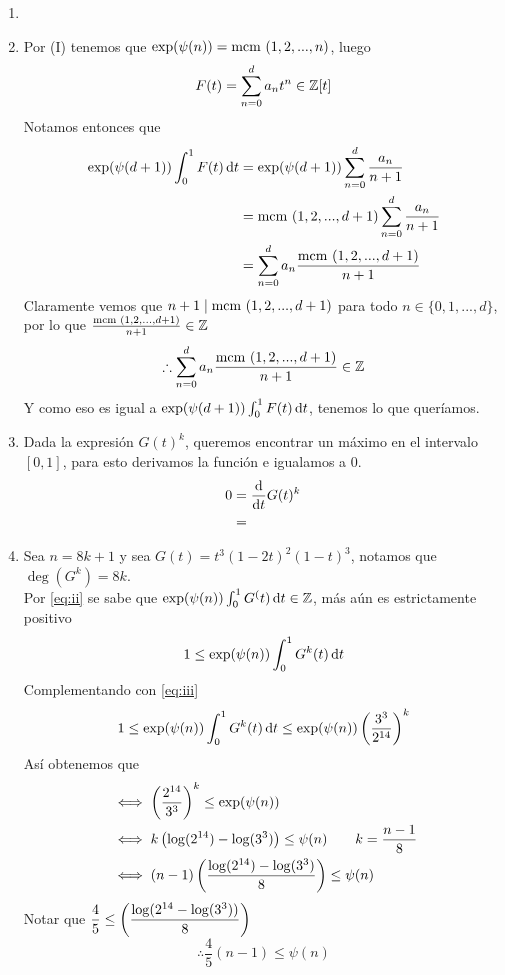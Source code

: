 \begin{sol}
	\begin{enumerate}[label = \roman*]
		\item

		\item Por (I) tenemos que $\exp(\psi(n))=\text{mcm }(1,2,...,n)$, luego
		      \[F(t)=\sum_{n=0}^da_nt^n\in\mathbb{Z}[t]\]
		      Notamos entonces que
		      \begin{align*}
			      \exp(\psi(d+1))\int_0^1 F(t)\operatorname{d}\!{t} & =\exp(\psi(d+1))\sum_{n=0}^d\frac{a_n}{n+1}   \\
			                                        & =\text{mcm }(1,2,...,d+1)\sum_{n=0}^d\frac{a_n}{n+1} \\
			                                        & =\sum_{n=0}^da_n\frac{\text{mcm }(1,2,...,d+1)}{n+1}
		      \end{align*}
		      Claramente vemos que $n+1\mid\text{mcm }(1,2,...,d+1)$ para todo $n\in\{0,1,...,d\}$, por lo que $\frac{\text{mcm }(1,2,...,d+1)}{n+1}\in\mathbb{Z}$
			  \begin{equation*}
				\therefore \sum_{n=0}^da_n\frac{\text{mcm }(1,2,...,d+1)}{n+1}\in\mathbb{Z}\label{eq:ii}
			  \end{equation*}
		      Y como eso es igual a $\exp(\psi(d+1))\int_0^1F(t)\operatorname{d}\!{t}$, tenemos lo que queríamos.

		\item Dada la expresión $G(t)^k$, queremos encontrar un máximo en el intervalo $[0,1]$, para esto derivamos la función e igualamos a 0.
		      \begin{align*}
			      0 & =\frac{\operatorname{d}\!{}}{\operatorname{d}\!{t}}G(t)^k \\
			        & =
		      \end{align*}
			  \label{eq:iii}
		\item Sea $n=8k+1$ y sea $G(t)=t^3(1-2t)^2(1-t)^3$, notamos que $\deg(G^k)=8k$.\\
		Por \eqref{eq:ii} se sabe que $\exp(\psi(n))\int_0^1G^(t)\operatorname{d}\!{t}\in\mathbb{Z}$, más aún es estrictamente positivo
		\begin{equation*}
			1\leq\exp(\psi(n))\int_0^1G^k(t)\operatorname{d}\!{t}
		\end{equation*}
		Complementando con \eqref{eq:iii}
		\begin{equation*}
			1\leq\exp(\psi(n))\int_0^1G^k(t)\operatorname{d}\!{t}\leq\exp(\psi(n))\left(\frac{3^3}{2^{14}}\right)^k
		\end{equation*}
		Así obtenemos que
		\begin{align*}
			&\iff\left(\dfrac{2^{14}}{3^3}\right)^k\leq\exp(\psi(n))\\
			&\iff k\left(\log(2^{14})-\log(3^3)\right)\leq\psi(n)\qquad k=\frac{n-1}{8}\\
			&\iff (n-1)\left(\frac{\log(2^{14})-\log(3^3)}8\right)\leq\psi(n)
		\end{align*}
		Notar que $\dfrac45\leq\left(\dfrac{\log(2^{14}-\log(3^3))}8\right)$
		\begin{equation*}
			\therefore\frac45(n-1)\leq\psi(n)
		\end{equation*}
	\end{enumerate}
\end{sol}

